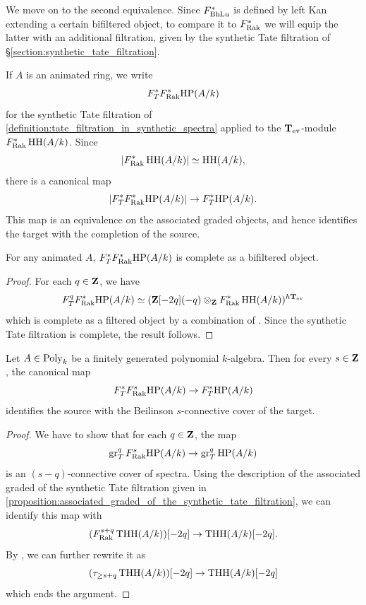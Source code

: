 \documentclass[oneside,a4paper]{amsart}
\begin{document}
We move on to the second equivalence. Since $F^{\ast}_{\mathrm{BhLu}}$ is defined by left Kan extending a certain bifiltered object, to compare it to $F^{\ast}_{\mathrm{Rak}}$ we will equip the latter with an additional filtration, given by the synthetic Tate filtration of \S \ref{section:synthetic_tate_filtration}. 

\begin{notation}
\label{notation:tate_filtration_on_raksits_filtered_hp}
If $A$ is an animated ring, we write 
\begin{equation}
\label{equation:synthetic_tate_of_raksits_hkr_hh}
F_{T}^{\ast} F^{\ast}_{\mathrm{Rak}} \mathrm{HP}(A / k)
\end{equation}
for the synthetic Tate filtration of \cref{definition:tate_filtration_in_synthetic_spectra} applied to the $\mathbf{T}_{\mathrm{ev}}$-module $F^{\ast}_{\mathrm{Rak}} \operatorname{HH}(A / k)$. Since
\[
| F^{\ast}_{\mathrm{Rak}} \operatorname{HH}(A/k) | \simeq \operatorname{HH}(A/k), 
\]
there is a canonical map
\[
| F^{\ast}_{T} F^{\ast}_{\mathrm{Rak}} \mathrm{HP}(A/k)| \rightarrow F_{T}^* \mathrm{HP}(A/k). 
\]
This map is an equivalence on the associated graded objects, and hence identifies the target with the completion of the source. 
\end{notation}

\begin{lemma}
\label{lemma:tate_filtered_raksits_hp_is_bicomplete}
For any animated $A$, $F^{\ast}_{T} F^{\ast}_{\mathrm{Rak}} \mathrm{HP}(A/k)$ is complete as a bifiltered object. 
\end{lemma}

\begin{proof}
For each $q \in \mathbf{Z}$, we have 
\[
F_{T}^{q} F^{\ast}_{\mathrm{Rak}} \mathrm{HP}(A / k) \simeq (\mathbf{Z}[-2q](-q)  \otimes_{\mathbf{Z}} F^{\ast}_{\mathrm{Rak}} \operatorname{HH}(A / k))^{h \mathbf{T}_{\mathrm{ev}}}
\]
which is complete as a filtered object by a combination of \cite[{Proposition 6.2.9, Proposition 6.3.7}]{raksit:2020}. Since the synthetic Tate filtration is complete, the result follows. 
\end{proof}

\begin{lemma}
\label{lemma:synthetic_tate_filtered_raksits_hp_is_a_beilinson_tower_for_polynomial_rings}
Let $A \in \mathrm{Poly}_{k}$ be a finitely generated polynomial $k$-algebra. Then for every $s \in \mathbf{Z}$, the canonical map 
\[
F_{T}^{\ast} F_{\mathrm{Rak}}^{s} \mathrm{HP}(A / k) \rightarrow F_{T}^{\ast} \mathrm{HP}(A / k) 
\]
identifies the source with the Beilinson $s$-connective cover of the target. 
\end{lemma}

\begin{proof}
We have to show that for each $q \in \mathbf{Z}$, the map 
\[
\operatorname{gr}_{T}^{q} F^{s}_{\mathrm{Rak}} \mathrm{HP}(A / k) \rightarrow \operatorname{gr}_{T}^{q} \mathrm{HP}(A / k) 
\]
is an $(s-q)$-connective cover of spectra. Using the description of the associated graded of the synthetic Tate filtration given in \cref{proposition:associated_graded_of_the_synthetic_tate_filtration}, we can identify this map with 
\[
(F^{s+q}_{\mathrm{Rak}} \operatorname{THH}(A / k))[-2q] \rightarrow \operatorname{THH}(A / k)[-2q].
\]
By \cite[{Remark 6.2.10}]{raksit:2020}, we can further rewrite it as 
\[
(\tau_{\geq s+q} \operatorname{THH}(A / k))[-2q] \rightarrow \operatorname{THH}(A / k)[-2q]
\]
which ends the argument. 
\end{proof}
\end{document}
